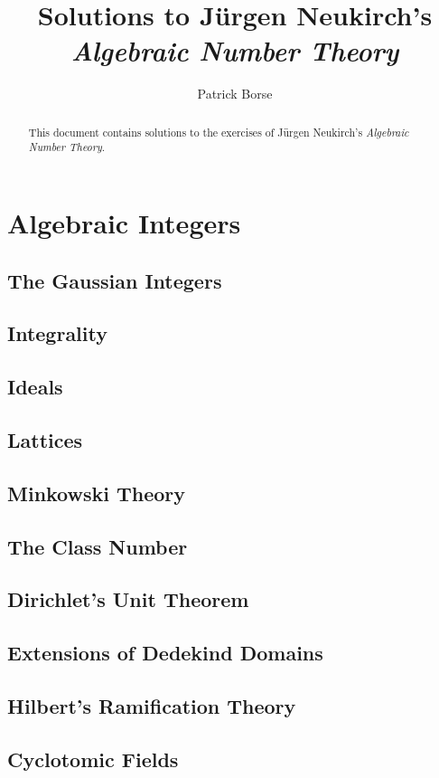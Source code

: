 \documentclass[oneside]{amsbook}
\title{Solutions to Jürgen Neukirch's\\ \emph{Algebraic Number Theory}}
\author{Patrick Borse}
\numberwithin{ex}{section}
\begin{document}
\begin{abstract}
This document contains solutions to the exercises of Jürgen Neukirch's \emph{Algebraic Number Theory}.
\end{abstract}

\maketitle

\tableofcontents

\chapter{Algebraic Integers}
\section{The Gaussian Integers}

\section{Integrality}

\section{Ideals}

\section{Lattices}

\section{Minkowski Theory}

\section{The Class Number}

\section{Dirichlet's Unit Theorem}

\section{Extensions of Dedekind Domains}

\section{Hilbert's Ramification Theory}

\section{Cyclotomic Fields}

\end{document}
